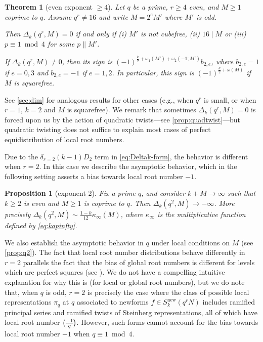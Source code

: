 \documentclass[11pt]{amsart}
\newcommand{\new}{\mathrm{new}}
\renewcommand{\mod}{\bmod}
\newcommand{\leg}{\overwithdelims ()}
\numberwithin{lem}{section}
\newtheorem{prop}[lem]{Proposition}
\newtheorem{thm}[lem]{Theorem}
\theoremstyle{remark}
\theoremstyle{definition}
\numberwithin{equation}{section}
\begin{document}
\begin{thm}  [even exponent $\ge 4$] \label{thm12}
Let $q$ be a prime, $r \ge 4$ even, and $M  \ge 1$ coprime to $q$.  Assume $q^r \ne 16$ and write $M = 2^e M'$ where $M'$ is odd. 

Then $\Delta_k(q^r, M) = 0$ if and only if (i) $M'$ is not cubefree, (ii) $16 \mid M$ or (iii) $p \equiv 1 \mod 4$ for some $p \parallel M'$.

If $\Delta_k(q^r, M) \ne 0$, then its sign is $(-1)^{\frac k2 + \omega_1(M') + \omega_2(-1;M')} b_{2,e}$, where $b_{2,e} = 1$ if $e = 0, 3$ and $b_{2,e} = -1$ if $e = 1, 2$.  In particular, this sign is $(-1)^{\frac k2 + \omega(M)}$ if $M$ is squarefree.
\end{thm}

See \cref{sec:dim} for analogous results for other cases (e.g., when $q^r$ is small, or when $r=1$, $k=2$ and $M$ is squarefree).  We remark that sometimes $\Delta_k(q^r, M) = 0$ is forced upon us by the action of quadratic twists---see \cref{prop:quadtwist}---but quadratic twisting does not suffice to explain most cases of perfect equidistribution of local root numbers.

Due to the $\delta_{r=2} (k-1) D_2$ term in \eqref{eq:Deltak-form}, the behavior is different when $r=2$.  In this case we describe the asymptotic behavior, which in the following setting asserts a bias towards local root number $-1$.

\begin{prop} [exponent 2] \label{prop13} 
Fix a prime $q$, and consider $k + M \to \infty$ such that $k \ge 2$ is even and $M \ge 1$ is coprime to $q$.  Then $\Delta_k(q^2, M) \to -\infty$.  More precisely $\Delta_k(q^2, M) \sim \frac{1-k}{12} \kappa_\infty(M)$, where $\kappa_\infty$ is the multiplicative function defined by \eqref{eq:kapinfty}.
\end{prop}

We also establish the asymptotic behavior in $q$ under local conditions on $M$ (see \cref{prop:q2}).  The fact that local root number distributions behave differently in $r=2$ parallels the fact that the bias of global root numbers is different for levels which are perfect squares (see \cite{me:rootno}).  We do not have a compelling intuitive explanation for why this is (for local or global root numbers), but we do note that, when $q$ is odd, $r=2$ is precisely the case where the class of possible local representations $\pi_q$ at $q$ associated to newforms $f \in S_k^\new(q^rN)$ includes ramified principal series and ramified twists of Steinberg representations, all of which have local root number ${-1 \leg q}$.  However, such forms cannot account for the bias towards local root number $-1$ when $q \equiv 1 \mod 4$.
\end{document}
